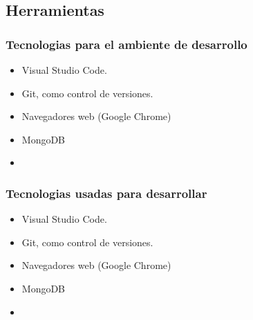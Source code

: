 \subsection{Herramientas}

\subsubsection*{Tecnologias para el ambiente de desarrollo}
\begin{itemize}
    \item Visual Studio Code.
    \item Git, como control de versiones.
    \item Navegadores web (Google Chrome)
    \item MongoDB
    \item 
\end{itemize}

\subsubsection*{Tecnologias usadas para desarrollar}
\begin{itemize}
    \item Visual Studio Code.
    \item Git, como control de versiones.
    \item Navegadores web (Google Chrome)
    \item MongoDB
    \item 
\end{itemize}


